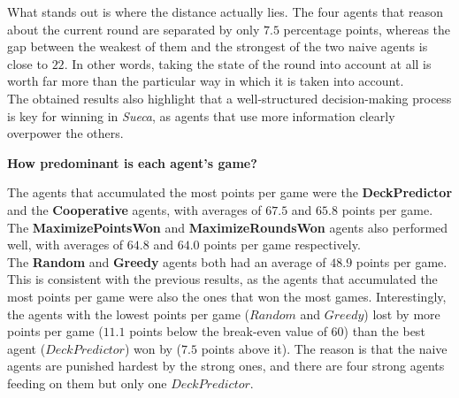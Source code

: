 \documentclass[sigconf]{acmart}
\begin{document}
\noindent What stands out is where the distance actually lies. The four agents that reason about the current round are separated by only $7.5$ percentage points, whereas the gap between the weakest of them and the strongest of the two naive agents is close to $22$. In other words, taking the state of the round into account at all is worth far more than the particular way in which it is taken into account.\\

\noindent The obtained results also highlight that a well-structured decision-making process is key for winning in \textit{Sueca}, as agents that use more information clearly overpower the others.\\



{\centering\fontsize{9}{24}\selectfont\textbf{How predominant is each agent's game?}\par}
\vspace{2mm} %

\noindent The agents that accumulated the most points per game were the \textbf{DeckPredictor} and the \textbf{Cooperative} agents, with averages of $67.5$ and $65.8$ points per game.\\
The \textbf{MaximizePointsWon} and \textbf{MaximizeRoundsWon} agents also performed well, with averages of $64.8$ and $64.0$ points per game respectively.\\
The \textbf{Random} and \textbf{Greedy} agents both had an average of $48.9$ points per game.\\

\noindent This is consistent with the previous results, as the agents that accumulated the most points per game were also the ones that won the most games. Interestingly, the agents with the lowest points per game ($Random$ and $Greedy$) lost by more points per game ($11.1$ points below the break-even value of $60$) than the best agent ($DeckPredictor$) won by ($7.5$ points above it). The reason is that the naive agents are punished hardest by the strong ones, and there are four strong agents feeding on them but only one $DeckPredictor$.\\
\end{document}
